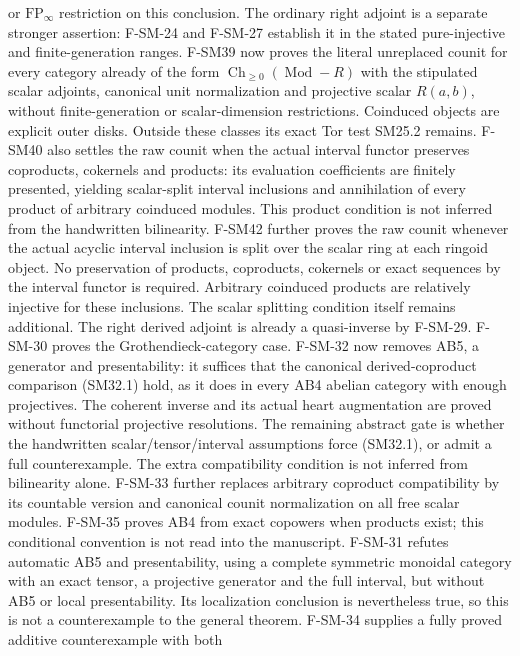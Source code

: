 \begin{description}[style=nextline,leftmargin=0pt]
or $\mathrm{FP}_\infty$ restriction on this conclusion.
The ordinary right adjoint is a separate stronger assertion:
F-SM-24 and F-SM-27 establish it in the stated pure-injective and
finite-generation ranges. F-SM39 now proves the literal unreplaced
counit for every category already of the form $\operatorname{Ch}_{\ge0}(\operatorname{Mod}\!-\!R)$
with the stipulated scalar adjoints, canonical unit normalization and
projective scalar $R(a,b)$, without finite-generation or scalar-dimension
restrictions. Coinduced objects are explicit outer disks. Outside these
classes its exact Tor test SM25.2 remains. F-SM40 also settles the raw
counit when the actual interval functor preserves coproducts,
cokernels and products: its evaluation coefficients are finitely
presented, yielding scalar-split interval inclusions and annihilation
of every product of arbitrary coinduced modules. This product
condition is not inferred from the handwritten bilinearity. F-SM42
further proves the raw counit whenever the actual acyclic interval
inclusion is split over the scalar ring at each ringoid object. No
preservation of products, coproducts, cokernels or exact sequences
by the interval functor is required. Arbitrary coinduced products
are relatively injective for these inclusions. The scalar splitting
condition itself remains additional. The right derived adjoint is already a quasi-inverse by
F-SM-29. F-SM-30 proves the Grothendieck-category case.
F-SM-32 now removes AB5, a generator and presentability: it suffices
that the canonical derived-coproduct comparison (SM32.1) hold, as it
does in every AB4 abelian category with enough projectives. The
coherent inverse and its actual heart augmentation are proved without
functorial projective resolutions. The remaining abstract gate is
whether the handwritten scalar/tensor/interval assumptions force
(SM32.1), or admit a full counterexample. The extra compatibility
condition is not inferred from bilinearity alone. F-SM-33 further replaces arbitrary coproduct compatibility by its
countable version and canonical counit normalization on all free scalar
modules. F-SM-35 proves AB4 from exact copowers when products exist;
this conditional convention is not read into the manuscript.
F-SM-31 refutes automatic AB5 and presentability,
using a complete symmetric monoidal category with an exact tensor,
a projective generator and the full interval, but without AB5 or
local presentability. Its localization conclusion is nevertheless
true, so this is not a counterexample to the general theorem.
F-SM-34 supplies a fully proved additive counterexample with both

\end{description}
